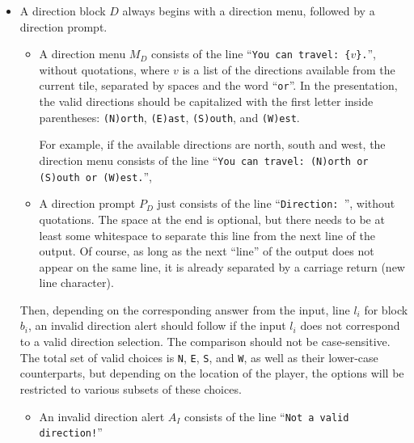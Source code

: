 \begin{itemize}
    \item
    A direction block $D$ always begins with
    a direction menu, followed by a direction prompt.
    \begin{itemize}
        \item
        A direction menu $M_D$ consists of the line
        ``\texttt{You can travel: \{$v$\}.}'', without quotations,
        where $v$ is a list of the directions available
        from the current tile,
        separated by spaces and the word ``\texttt{or}''.
        In the presentation, the valid directions should be capitalized
        with the first letter inside parentheses:
        \texttt{(N)orth}, \texttt{(E)ast},
        \texttt{(S)outh}, and \texttt{(W)est}.

        For example, if the available directions are
        north, south and west,
        the direction menu consists of the line
        ``\texttt{You can travel: (N)orth or (S)outh or (W)est.}'',

        \item
        A direction prompt $P_D$ just consists of the line
        ``\texttt{Direction: }'', without quotations.
        The space at the end is optional,
        but there needs to be at least some whitespace
        to separate this line from the next line of the output.
        Of course, as long as the next ``line'' of the output does not appear on the same line,
        it is already separated by a carriage return (new line character).
    \end{itemize}
    Then, depending on the corresponding answer from the input,
    line $l_i$ for block $b_i$,
    an invalid direction alert should follow
    if the input $l_i$ does not correspond to a valid direction selection.
    The comparison should not be case-sensitive.
    The total set of valid choices is
    \texttt{N}, \texttt{E}, \texttt{S}, and \texttt{W},
    as well as their lower-case counterparts,
    but depending on the location of the player,
    the options will be restricted to various subsets of these choices.
    \begin{itemize}
        \item
        An invalid direction alert $A_I$ consists of the line
        ``\texttt{Not a valid direction!}''
    \end{itemize}


\end{itemize}
